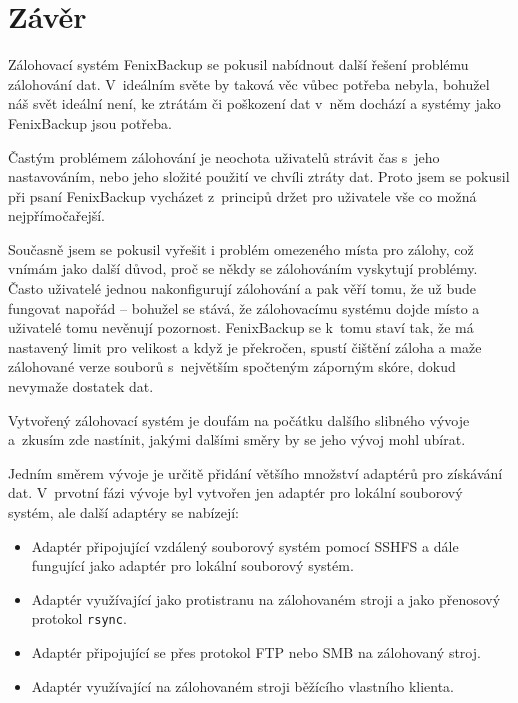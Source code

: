 \chapter*{Závěr}

Zálohovací systém FenixBackup se pokusil nabídnout další řešení problému
zálohování dat. V~ideálním světe by taková věc vůbec potřeba nebyla, bohužel náš
svět ideální není, ke ztrátám či poškození dat v~něm dochází a systémy jako
FenixBackup jsou potřeba.

Častým problémem zálohování je neochota uživatelů strávit čas s~jeho
nastavováním, nebo jeho složité použití ve chvíli ztráty dat. Proto jsem se
pokusil při psaní FenixBackup vycházet z~principů držet pro uživatele vše co
možná nejpřímočařejší.

Současně jsem se pokusil vyřešit i problém omezeného místa pro zálohy, což
vnímám jako další důvod, proč se někdy se zálohováním vyskytují problémy. Často
uživatelé jednou nakonfigurují zálohování a pak věří tomu, že už bude fungovat
napořád -- bohužel se stává, že zálohovacímu systému dojde místo a uživatelé
tomu nevěnují pozornost. FenixBackup se k~tomu staví tak, že má nastavený limit
pro velikost a když je překročen, spustí čištění záloha a maže zálohované verze
souborů s~největším spočteným záporným skóre, dokud nevymaže dostatek dat.

Vytvořený zálohovací systém je doufám na počátku dalšího slibného vývoje a~zkusím
zde nastínit, jakými dalšími směry by se jeho vývoj mohl ubírat.


Jedním směrem vývoje je určitě přidání většího množství adaptérů pro získávání
dat. V~prvotní fázi vývoje byl vytvořen jen adaptér pro lokální souborový
systém, ale další adaptéry se nabízejí:
\begin{itemize}
	\item Adaptér připojující vzdálený souborový systém pomocí \gls{SSHFS}
	a dále fungující jako adaptér pro lokální souborový systém.
	\item Adaptér využívající jako protistranu na zálohovaném stroji a jako
	přenosový protokol \texttt{rsync}.
	\item Adaptér připojující se přes protokol \gls{FTP} nebo \gls{SMB} na
	zálohovaný stroj.
	\item Adaptér využívající na zálohovaném stroji běžícího vlastního
	klienta.
\end{itemize}

